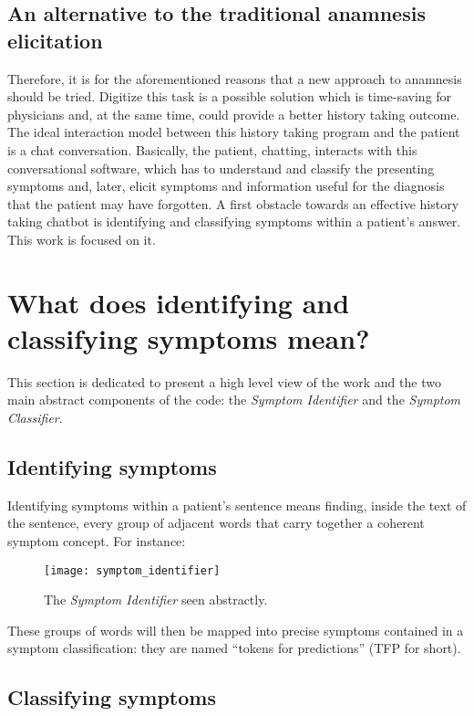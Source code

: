 \subsection{An alternative to the traditional anamnesis elicitation}

Therefore, it is for the aforementioned reasons that a new approach to anamnesis should be tried. Digitize this task is a possible solution which is time-saving for physicians and, at the same time, could provide a better history taking outcome. The ideal interaction model between this history taking program and the patient is a chat conversation. Basically, the patient, chatting, interacts with this conversational software, which has to understand and classify the presenting symptoms and, later, elicit symptoms and information useful for the diagnosis that the patient may have forgotten. A first obstacle towards an effective history taking chatbot is identifying and classifying symptoms within a patient’s answer. This work is focused on it.

\section{What does identifying and classifying symptoms mean?}

This section is dedicated to present a high level view of the work and the two main abstract components of the code: the \textit{Symptom Identifier} and the \textit{Symptom Classifier}. 

\label{sec:identifying_classifying}
\subsection{Identifying symptoms}

Identifying symptoms within a patient's sentence means finding, inside the text of the sentence, every group of adjacent words that carry together a coherent symptom concept. For instance:

\begin{figure}[h]
\centering
\texttt{[image: symptom\_identifier]}
\caption{The \textit{Symptom Identifier} seen abstractly.}
\medskip
\end{figure}
\newpage
These groups of words will then be mapped into precise symptoms contained in a symptom classification: they are named “tokens for predictions” (TFP for short).

\subsection{Classifying symptoms}
\label{sec:cla_symp}

